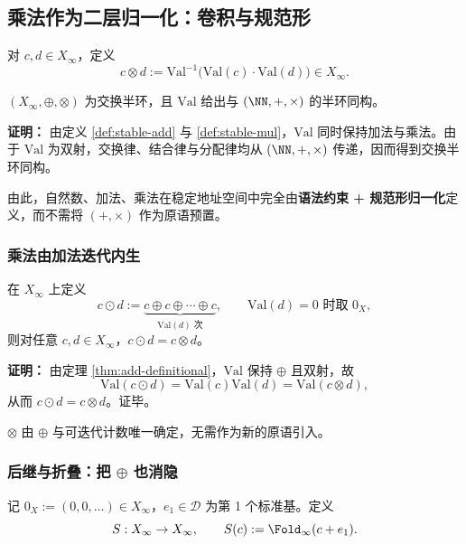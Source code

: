 \subsection{乘法作为二层归一化：卷积与规范形}

\begin{definition}[稳定乘法]\label{def:stable-mul}
对 $c,d\in X_\infty$，定义
\[
c\otimes d:=\mathrm{Val}^{-1}\bigl(\mathrm{Val}(c)\cdot\mathrm{Val}(d)\bigr)\in X_\infty.
\]
\end{definition}

\begin{theorem}\label{thm:mul-definitional}
$(X_\infty,\oplus,\otimes)$ 为交换半环，且 $\mathrm{Val}$ 给出与 $(\NN,+,\times)$ 的半环同构。
\end{theorem}

\textbf{证明：}
由定义 \ref{def:stable-add} 与 \ref{def:stable-mul}，$\mathrm{Val}$ 同时保持加法与乘法。由于 $\mathrm{Val}$ 为双射，交换律、结合律与分配律均从 $(\NN,+,\times)$ 传递，因而得到交换半环同构。

由此，自然数、加法、乘法在稳定地址空间中完全由\textbf{语法约束 + 规范形归一化}定义，而不需将 $(+,\times)$ 作为原语预置。

\subsubsection{乘法由加法迭代内生}\label{subsec:mul-as-iterated-add}
\begin{theorem}[乘法可由加法与迭代内生]\label{thm:mul-by-iterated-add}
在 $X_\infty$ 上定义
\[
c\odot d:=\underbrace{c\oplus c\oplus\cdots\oplus c}_{\mathrm{Val}(d)\text{ 次}},
\qquad
\mathrm{Val}(d)=0\text{ 时取 }0_X,
\]
则对任意 $c,d\in X_\infty$，$c\odot d=c\otimes d$。
\end{theorem}

\textbf{证明：}
由定理 \ref{thm:add-definitional}，$\mathrm{Val}$ 保持 $\oplus$ 且双射，故
\[
\mathrm{Val}(c\odot d)=\mathrm{Val}(c)\mathrm{Val}(d)=\mathrm{Val}(c\otimes d),
\]
从而 $c\odot d=c\otimes d$。证毕。

\begin{corollary}[“合并”的第一种严格版本]\label{cor:mul-no-new-primitive}
$\otimes$ 由 $\oplus$ 与可迭代计数唯一确定，无需作为新的原语引入。
\end{corollary}

\subsubsection{后继与折叠：把 \texorpdfstring{$\oplus$}{oplus} 也消隐}\label{subsec:succ-and-fold}
\begin{definition}[后继与折叠]\label{def:successor-fold}
记 $0_X:=(0,0,\dots)\in X_\infty$，$e_1\in\mathcal{D}$ 为第 1 个标准基。定义
\[
S:X_\infty\to X_\infty,\qquad S(c):=\Fold_\infty(c+e_1).
\]
\end{definition}


